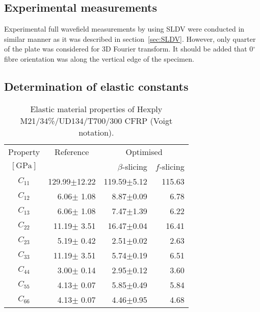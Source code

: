 \documentclass[preprint,12pt]{elsarticle}
\begin{document}
\subsection{Experimental measurements}
Experimental full wavefield measurements by using SLDV were conducted in similar manner as it was described in section~\ref{sec:SLDV}. 
However, only quarter of the plate was considered for 3D Fourier transform.
It should be added that 0\(^{\circ}\) fibre orientation was along the vertical edge of the specimen.
\subsection{Determination of elastic constants}
\begin{table}[h]
	\renewcommand{\arraystretch}{1.3}
	\centering \footnotesize
	\caption{Elastic material properties of Hexply M21/34\%/UD134/T700/300 CFRP (Voigt notation).}
	\begin{tabular}{crrr} 
		\toprule
		Property & \multicolumn{1}{c}{Reference} & \multicolumn{2}{c}{Optimised}\\
		\cmidrule(lr){3-4}
		$\left[\textrm{GPa}\right]$ & \multicolumn{1}{c}{\cite{Moll2019}} & $\beta$-slicing & $f$-slicing \\ 
		\midrule 
		$C_{11}$ & 129.99$\pm$12.22  & 119.59$\pm$5.12 & 115.63 \\ 
		$C_{12}$ &   6.06$\pm$ 1.08  &   8.87$\pm$0.09 &   6.78\\ 
		$C_{13}$ &   6.06$\pm$ 1.08  &   7.47$\pm$1.39 &   6.22\\
		$C_{22}$ &  11.19$\pm$ 3.51  &  16.47$\pm$0.04 &  16.41\\
		$C_{23}$ &   5.19$\pm$ 0.42  &   2.51$\pm$0.02 &   2.63\\
		$C_{33}$ &  11.19$\pm$ 3.51  &   5.74$\pm$0.19 &   6.51\\
		$C_{44}$ &   3.00$\pm$ 0.14  &   2.95$\pm$0.12 &   3.60\\
		$C_{55}$ &   4.13$\pm$ 0.07  &   5.85$\pm$0.49 &   5.84\\
		$C_{66}$ &   4.13$\pm$ 0.07  &   4.46$\pm$0.95 &   4.68 \\
		\bottomrule
	\end{tabular} 
	\label{tab:mat_prop_identified_Moll}
\end{table}
\end{document}
